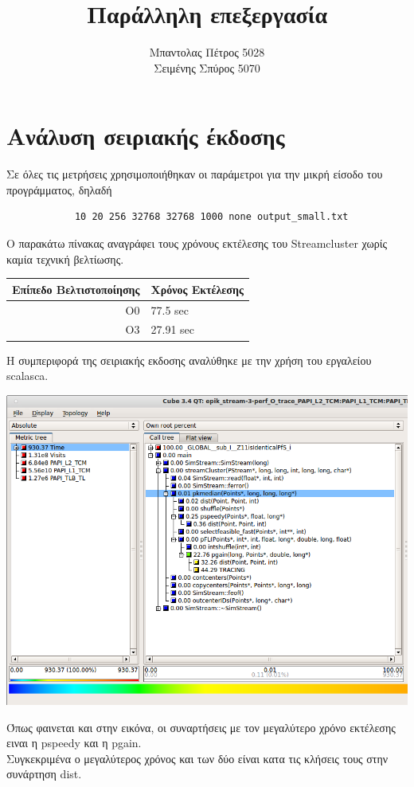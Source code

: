 \documentclass[a4paper,11pt]{article}
\title{Παράλληλη επεξεργασία}
\author{Μπαντολας Πέτρος 5028\\Σειμένης Σπύρος 5070}
\date{}
\begin{document}
\maketitle
\section{Ανάλυση σειριακής έκδοσης}

\begin{itshape}
    Σε όλες τις μετρήσεις χρησιμοποιήθηκαν οι παράμετροι για την μικρή είσοδο του προγράμματος, δηλαδή
\end{itshape}
\begin{lstlisting}
            10 20 256 32768 32768 1000 none output_small.txt
\end{lstlisting}

Ο παρακάτω πίνακας αναγράφει τους χρόνους εκτέλεσης του Streamcluster χωρίς καμία τεχνική βελτίωσης.

\begin{center}
\begin{tabular}{|r|l|}
    \hline
    Επίπεδο Βελτιστοποίησης & Χρόνος Εκτέλεσης \\ \hline
    O0 & 77.5 sec \\
    O3 & 27.91 sec \\ \hline
\end{tabular}
\end{center}

Η συμπεριφορά της σειριακής εκδοσης αναλύθηκε με την χρήση του εργαλείου scalasca.
\begin{center}
\includegraphics[width=\textwidth]{../scrshots/time.png}
\end{center} 
Όπως φαινεται και στην εικόνα, οι συναρτήσεις με τον μεγαλύτερο χρόνο εκτέλεσης ειναι η pspeedy και η pgain.\\
Συγκεκριμένα ο μεγαλύτερος χρόνος και των δύο είναι κατα τις κλήσεις τους στην συνάρτηση dist.
\end{document}
